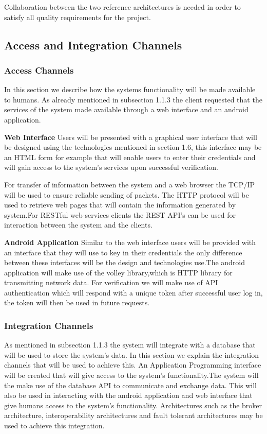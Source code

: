 \documentclass[a4paper,12pt]{article}
\begin{document}
Collaboration between the two reference architectures is needed in order to satisfy all quality requirements for the project.

\newpage

\subsection{Access and Integration Channels}
\subsubsection{Access Channels}
In this section we describe how the systems functionality will be made available to humans. As already mentioned in subsection 1.1.3 the client requested that the services of the system made available through a web interface and an android application.

\textbf{Web Interface}
Users will be presented with a graphical user interface that will be designed using the technologies mentioned in section 1.6, this interface may be an HTML form for example that will enable users to enter their credentials and will gain access to the system's services upon successful verification.

For transfer of information between the system and a web browser the TCP/IP will be used to ensure reliable sending of packets. The HTTP protocol will be used to retrieve web pages that will contain the information generated by system.For RESTful web-services clients the REST API's can be used for interaction between the system and the clients.

\textbf{Android Application}
Similar to the web interface users will be provided with an interface that they will use to key in their credentials the only difference between these interfaces will be the design and technologies use.The android application will make use of the volley library,which is HTTP library for transmitting network data.
For verification we will make use of API authentication which will respond with a unique token after successful user log in, the token will then be used in future requests.

\subsubsection{Integration Channels}
As mentioned in subsection 1.1.3 the system will integrate with a database that will be used to store the system's data. In this section we explain the integration channels that will be used to achieve this.
An Application Programming interface will be created that will give access to the system's functionality.The system will the make use of the database API to communicate and exchange data. This will also be used in interacting with the android application and web interface that give humans access to the system's functionality. Architectures such as the broker architecture, interoperability architectures and fault tolerant architectures may be used to achieve this integration.
\end{document}
